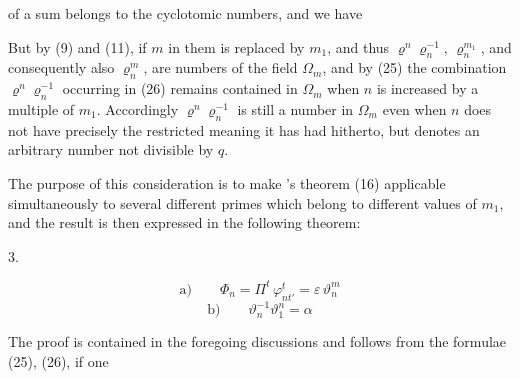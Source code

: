 of a  sum belongs to the cyclotomic numbers,
and we have

But by (9) and (11), if $m$ in them is replaced by $m_1$,
and thus $\varrho^n \varrho_n^{-1}$, $\varrho_n^{m_1}$, and consequently also $\varrho_n^m$, are numbers
of the field $\Omega_m$, and by (25) the combination $\varrho^n \varrho_n^{-1}$ occurring
in (26) remains contained in $\Omega_m$ when $n$ is increased by a
multiple of $m_1$. Accordingly $\varrho^n \varrho_n^{-1}$ is still a number in $\Omega_m$
even when $n$ does not have precisely the restricted meaning it
has had hitherto, but denotes an arbitrary number not divisible
by $q$.

The purpose of this consideration is to make 's
theorem (16) applicable simultaneously to several different primes
which belong to different values of $m_1$, and the result is then
expressed in the following theorem:

3. 

\[ \text{a)}\qquad \Phi_n = \Pi^{t}\, \varphi^t_{nt'} = \varepsilon\,\vartheta_n^m \]
\[ \text{b)}\qquad \vartheta_n^{-1}\vartheta_1^n = \alpha \]

The proof is contained in the foregoing discussions and
follows from the formulae (25), (26), if one
